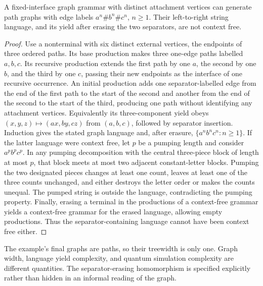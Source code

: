\begin{proposition}
A fixed-interface graph grammar with distinct attachment vertices can generate path graphs with edge labels
$a^n\#b^n\#c^n$, $n\ge1$. Their left-to-right string language, and its yield after erasing the two separators, are not context free.
\end{proposition}
\begin{proof}
Use a nonterminal with six distinct external vertices, the endpoints of three ordered paths. Its base production makes three one-edge paths labelled $a,b,c$. Its recursive production extends the first path by one $a$, the second by one $b$, and the third by one $c$, passing their new endpoints as the interface of one recursive occurrence. An initial production adds one separator-labelled edge from the end of the first path to the start of the second and another from the end of the second to the start of the third, producing one path without identifying any attachment vertices. Equivalently its three-component yield obeys
$(x,y,z)\mapsto(ax,by,cz)$ from $(a,b,c)$, followed by separator insertion. Induction gives the stated graph language and, after erasure, $\{a^nb^nc^n:n\ge1\}$.
If the latter language were context free, let $p$ be a pumping length and consider $a^pb^pc^p$. In any pumping decomposition with the central three-piece block of length at most $p$, that block meets at most two adjacent constant-letter blocks. Pumping the two designated pieces changes at least one count, leaves at least one of the three counts unchanged, and either destroys the letter order or makes the counts unequal. The pumped string is outside the language, contradicting the pumping property. Finally, erasing a terminal in the productions of a context-free grammar yields a context-free grammar for the erased language, allowing empty productions. Thus the separator-containing language cannot have been context free either.
\end{proof}

The example's final graphs are paths, so their treewidth is only one. Graph width, language yield complexity, and quantum simulation complexity are different quantities. The separator-erasing homomorphism is specified explicitly rather than hidden in an informal reading of the graph.

